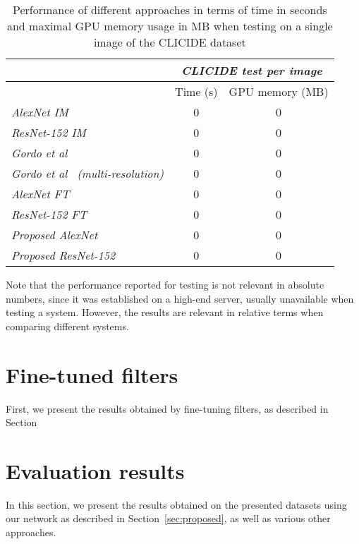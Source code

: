 \begin{table}
\begin{tabular}{|l|c|c|}
\hline & \multicolumn{2}{c|}{\emph{CLICIDE test per image}}\\
\hline & Time (s) & GPU memory (MB)\\
\hline \emph{AlexNet IM} & 0 & 0\\ %
\hline \emph{ResNet-152 IM} & 0 & 0\\
\hline \emph{Gordo et al~\cite{gordo_deep_2016}} & 0 & 0\\
\hline \emph{Gordo et al~\cite{gordo_deep_2016} (multi-resolution)}
& 0 & 0\\
\hline \emph{AlexNet FT} & 0 & 0\\ %
\hline \emph{ResNet-152 FT} & 0 & 0\\
\hline \emph{Proposed AlexNet} & 0 & 0\\ %
\hline \emph{Proposed ResNet-152} & 0 & 0\\
\hline
\end{tabular}
\caption{Performance of different approaches in terms of time in seconds and
maximal GPU memory usage in MB when testing on a single image
of the CLICIDE dataset\label{tab:perftest}}
\end{table}


Note that the performance reported for testing is not relevant in absolute numbers,
since it was established on a high-end server, usually unavailable when testing
a system. However, the results are relevant in relative terms when comparing
different systems.



\section{Fine-tuned filters}
First, we present the results obtained by fine-tuning filters, as described
in Section

\section{Evaluation results}
In this section, we present the results obtained on the presented datasets
using our network as described in Section~\ref{sec:proposed}, as well
as various other approaches.

